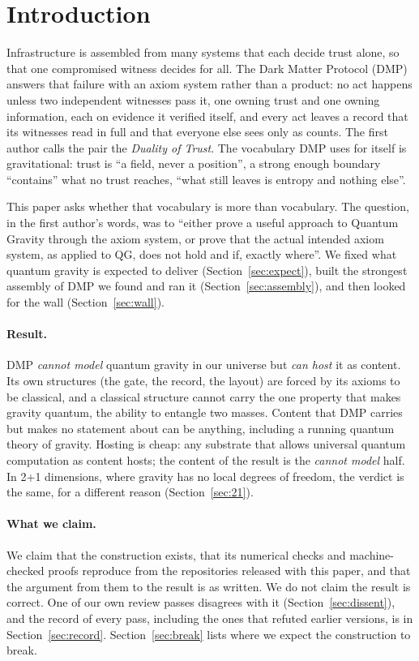 \documentclass[11pt,a4paper]{article}
\theoremstyle{definition}
\theoremstyle{remark}
\begin{document}
\medskip


\section{Introduction}\label{sec:intro}

Infrastructure is assembled from many systems that each decide trust alone, so that one compromised witness decides for all. The Dark
Matter Protocol (DMP) answers that failure with an axiom system rather than a product: no act happens unless two independent witnesses
pass it, one owning trust and one owning information, each on evidence it verified itself, and every act leaves a record that its
witnesses read in full and that everyone else sees only as counts. The first author calls the pair the \emph{Duality of Trust}. The
vocabulary DMP uses for itself is gravitational: trust is ``a field, never a position'', a strong enough boundary ``contains'' what no
trust reaches, ``what still leaves is entropy and nothing else''.

This paper asks whether that vocabulary is more than vocabulary. The question, in the first author's words, was to ``either prove a
useful approach to Quantum Gravity through the axiom system, or prove that the actual intended axiom system, as applied to QG, does not
hold and if, exactly where''. We fixed what quantum gravity is expected to deliver (Section~\ref{sec:expect}),
built the strongest assembly of DMP we found and ran it (Section~\ref{sec:assembly}), and then looked for the wall
(Section~\ref{sec:wall}).

\paragraph{Result.} DMP \emph{cannot model} quantum gravity in our universe but \emph{can host} it as content. Its own structures (the
gate, the record, the layout) are forced by its axioms to be classical, and a classical structure cannot carry the one property that
makes gravity quantum, the ability to entangle two masses. Content that DMP carries but makes no statement about can be anything,
including a running quantum theory of gravity. Hosting is cheap: any substrate that allows universal quantum computation as content
hosts; the content of the result is the \emph{cannot model} half. In 2+1 dimensions, where gravity has no local degrees of freedom, the
verdict is the same, for a different reason (Section~\ref{sec:21}).

\paragraph{What we claim.} We claim that the construction exists, that its numerical checks and machine-checked proofs reproduce from the
repositories released with this paper, and that the argument from them to the result is as written. We do not claim the result is correct. One of our own
review passes disagrees with it (Section~\ref{sec:dissent}), and the record of every pass, including the ones that refuted earlier
versions, is in Section~\ref{sec:record}. Section~\ref{sec:break} lists where we expect the construction to break.
\end{document}
